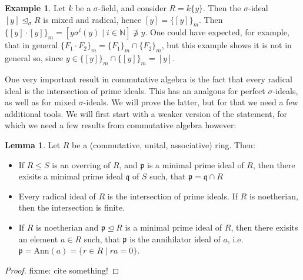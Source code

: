 \documentclass{article}
\def\N{\mathbb{N}}
\def\p{\mathfrak{p}}
\def\q{\mathfrak{q}}
\def\s{\sigma}
\def\si{\unlhd_{\sigma}}
\newenvironment{bew}{\begin{proof}[Proof]}{\end{proof}}
\theoremstyle{definition}
\newtheorem{ex}[Satz]{Example}
\newtheorem{lem}[Satz]{Lemma}
\begin{document}
\begin{ex}
 
Let $k$ be a $\s$-field, and consider $R = k\{y\}$. Then the $\s$-ideal $[y] \si R$ is mixed and radical, hence $[y] = \{[y]\}_m$. 
Then $\{ [y] \cdot [y] \}_m = [ y \s^i(y) \mid i \in \N ] \not \ni y$.
One could have expected, for example, that in general $\{F_1 \cdot F_2 \}_m = \{F_1\}_m \cap \{F_2\}_m$, but this example shows it is not in general so, since $y \in \{ [y] \}_m \cap \{ [y] \}_m = [y]$.
\end{ex}

One very important result in commutative algebra is the fact that every radical ideal is the intersection of prime ideals. This has an analgous for perfect $\s$-ideals, as well as for mixed $\s$-ideals. 
We will prove the latter, but for that we need a few additional tools. We will first start with a weaker version of the statement, for which we need a few results from commutative algebra however:

\begin{lem}\label{commalg}
Let $R$ be a (commutative, unital, associative) ring. Then:
\begin{itemize}
\item If $R \leq S$ is an overring of $R$, and $\p$ is a minimal prime ideal of $R$, then there exisits a minimal prime ideal $\q$ of $S$ such, that $\p = \q \cap R$
\item Every radical ideal of $R$ is the intersection of prime ideals. If $R$ is noetherian, then the intersection is finite.
\item If $R$ is noetherian and $\p \unlhd R$ is a minimal prime ideal of $R$, then there exisits an element $a \in R$ such, that $\p$ is the annihilator ideal of $a$, i.e. $\p = \text{Ann}(a) = \{ r \in R \mid ra = 0 \}$.
\end{itemize}
\begin{bew}
fixme: cite something!
\end{bew}
\end{lem}
\end{document}
